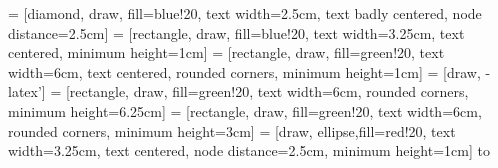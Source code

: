 \documentclass[8pt]{beamer}
\title{\sc{Shape Optimization \& Applications: ESR 11}}
\author{\textbf{{Soheil Hajian\\(representing Michael Hinterm\"uller)}}}
\date{April 9, 2018}
\begin{document}
%
 = [diamond, draw, fill=blue!20, 
    text width=2.5cm, text badly centered, node distance=2.5cm]
 = [rectangle, draw, fill=blue!20, 
    text width=3.25cm, text centered,%
 minimum height=1cm]
 = [rectangle, draw, fill=green!20, 
    text width=6cm, text centered, rounded corners, minimum height=1cm]
 = [draw, -latex']
 = [rectangle, draw, fill=green!20, 
    text width=6cm, rounded corners, minimum height=6.25cm]
 = [rectangle, draw, fill=green!20, 
    text width=6cm, rounded corners, minimum height=3cm]
 = [draw, ellipse,fill=red!20, 
text width=3.25cm, text centered, node distance=2.5cm,
    minimum height=1cm]
{
\usebackgroundtemplate%
{
\vbox to 
}
\frame{\titlepage}
}
%
\end{document}
